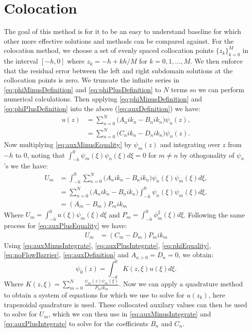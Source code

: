 \documentclass[a4paper,12pt]{report}
\begin{document}
\section{Colocation}
The goal of this method is for it to be an easy to understand baseline for which other more effective solutions and methods can be compared against.
For the colocation method, we choose a set of evenly spaced collocation points $\{z_k\}_{k=0}^{M}$ in the interval $[-h, 0]$ where $z_k = -h + kh/M$ for $k = 0, 1, \ldots, M$. We then enforce that the residual error between the left and right subdomain solutions at the collocation points is zero. We truncate the infinite series in \ref{eq:phiMinusDefinition} and \ref{eq:phiPlusDefinition} to $N$ terms so we can perform numerical calculations.
Then applying \ref{eq:phiMinusDefinition} and \ref{eq:phiPlusDefinition} into the above (\ref{eq:auxDefinition}) we have:
\begin{align}
\label{eq:auxMinusEquality}
u(z) &= \sum_{n=0}^{N} \big(A_nik_n - B_nik_n\big)\psi_n(z),\\
\label{eq:auxPlusEquality}
&= \sum_{n=0}^{N} \big(C_nik_n - D_nik_n\big)\psi_n(z).
\end{align}
Now multiplying \ref{eq:auxMinusEquality} by $\psi_m(z)$ and integrating over $z$ from $-h$ to $0$, noting that $\int_{-h}^0\psi_m(\xi)\psi_n(\xi) d\xi = 0$ for $m\neq n$ by othogonality of $\psi_n$'s we the have:
\begin{align}
\label{eq:auxMinusIntegrate}
U_m &= \int_{-h}^{0}\sum_{n=0}^{N} \big(A_nik_n - B_nik_n\big)\psi_n(\xi)\psi_m(\xi)d\xi,\nonumber\\
&= \sum_{n=0}^{N} \big(A_nik_n - B_nik_n\big)\int_{-h}^{0}\psi_n(\xi)\psi_m(\xi)d\xi,\nonumber\\
&= (A_m - B_m)P_mik_m
\end{align}
Where $U_m = \int^0_{-h}u(\xi) \psi_m(\xi) d\xi$ and $P_m = \int^0_{-h}\phi_m^2(\xi) d\xi$. Following the same process for \ref{eq:auxPlusEquality} we have:
\begin{align}
\label{eq:auxPlusIntegrate}
U_m &= (C_m - D_m)P_mik_m
\end{align}
Using \ref{eq:auxMinusIntegrate}, \ref{eq:auxPlusIntegrate}, \ref{eq:phiEquality}, \ref{eq:noFlowBarrier}, \ref{eq:auxDefinition} and $A_{n>0} = D_n = 0$, we obtain:
\begin{equation}
\label{eq:colocationSystem}
\psi_0(z) = \int_{-d}^0 K(z,\xi) u(\xi) d\xi.
\end{equation}
Where $\displaystyle K(z,\xi) = \sum_{m=0}^{N} \frac{\psi_m(z)\psi_m(\xi)}{P_mik_m}$. Now we can apply a quadrature method to obtain a system of equations for which we use to solve for $u(z_k)$, here trapezoidal quadrature is used. These collocated auxilary values can then be used to solve for $U_m$, which we can then use in \ref{eq:auxMinusIntegrate} and \ref{eq:auxPlusIntegrate} to solve for the coefficients $B_n$ and $C_n$.
\end{document}
